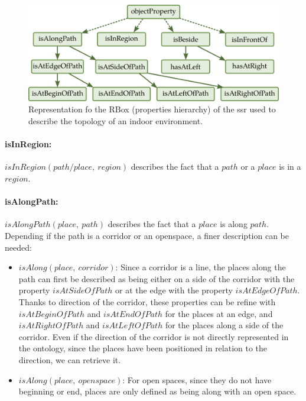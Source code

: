 \begin{figure}[ht!]
\centering
\includegraphics[scale=0.42]{figures/chapter3/ssr_rbox.png}
\caption{\label{fig:chap3_rbox} Representation fo the RBox (properties hierarchy) of the \acrlong{ssr} used to describe the topology of an indoor environment.}
\end{figure}

\paragraph{isInRegion:} $isInRegion(path/place,\ region)$ describes the fact that a $path$ or a $place$ is in a $region$.

\paragraph{isAlongPath:} $isAlongPath(place,\ path)$ describes the fact that a $place$ is along $path$. Depending if the path is a corridor or an openspace, a finer description can be needed:
\begin{itemize}
  
  \item $isAlong(place,\ corridor)$: Since a corridor is a line, the places along the path can first be described as being either on a side of the corridor with the property $isAtSideOfPath$ or at the edge with the property $isAtEdgeOfPath$. Thanks to direction of the corridor, these properties can be refine with $isAtBeginOfPath$ and $isAtEndOfPath$ for the places at an edge, and  $isAtRightOfPath$ and $isAtLeftOfPath$ for the places along a side of the corridor. Even if the direction of the corridor is not directly represented in the ontology, since the places have been positioned in relation to the direction, we can retrieve it.
  \item $isAlong(place,\ openspace)$: For open spaces, since they do not have beginning or end, places are only defined as being along with an open space.
\end{itemize}

